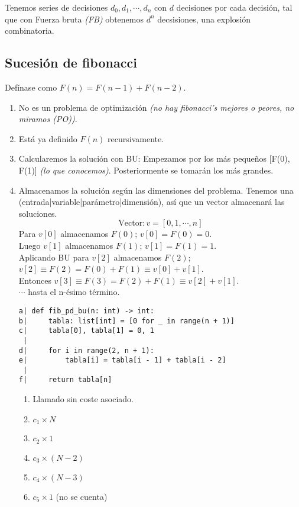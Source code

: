 \documentclass[tikz,11pt,fleqn]{book} %
\begin{document}
Tenemos series de decisiones $d_0,d_1,\cdots,d_n$ con $d$ decisiones por cada decisión, tal que con Fuerza bruta \textit{(FB)} obtenemos $d^n$ decsisiones, una explosión combinatoria.

\subsection{Sucesión de fibonacci}
\begin{example}
    Defínase como $F(n)=F(n-1)+F(n-2)$.
    \begin{enumerate}
        \item No es un problema de optimización \textit{(no hay fibonacci's mejores o peores, no miramos (PO))}.
        \item Está ya definido $F(n)$ recursivamente.
        \item Calcularemos la solución con BU:
        Empezamos por los más pequeños [F(0), F(1)] \textit{(lo que conocemos)}. Posteriormente se tomarán los más grandes.
        \item Almacenamos la solución según las dimensiones del problema. Tenemos una (entrada|variable|parámetro|dimensión), así que un vector almacenará las soluciones.
        $$\text{Vector}:v=[0, 1, \cdots,n]$$
        Para $v[0]$ almacenamos $F(0)$; $v[0]=F(0)=0$.\\
        Luego $v[1]$ almacenamos $F(1)$; $v[1]=F(1)=1$.\\
        Aplicando BU para $v[2]$ almacenamos $F(2)$; $v[2]\equiv F(2)=F(0)+F(1)\equiv v[0]+v[1]$.\\
       Entonces $v[3]\equiv F(3)=F(2)+F(1)\equiv v[2]+v[1]$.\\
        $\cdots$ hasta el n-ésimo término.

    \begin{multicols}{2}
\begin{lstlisting}
a| def fib_pd_bu(n: int) -> int:
b|     tabla: list[int] = [0 for _ in range(n + 1)]
c|     tabla[0], tabla[1] = 0, 1
 | 
d|     for i in range(2, n + 1):
e|         tabla[i] = tabla[i - 1] + tabla[i - 2]
 | 
f|     return tabla[n]
\end{lstlisting}
        \columnbreak
\begin{enumerate}
    \item Llamado sin coste asociado.
    \item $c_1\times N$
    \item $c_2\times1$
    \item $c_3\times (N-2)$
    \item $c_4\times (N-3)$
    \item $c_5\times1$ (no se cuenta)
\end{enumerate}
    \end{multicols}


\end{enumerate}
\end{example}
\end{document}
